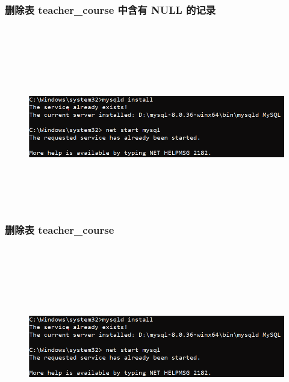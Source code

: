 \documentclass{ctexart}
\begin{document}
\subsubsection{删除表 teacher\_course 中含有 NULL 的记录}\begin{lstlisting}[language=sql]
	
\end{lstlisting}
\begin{figure}[H]
	\centering 
	\includegraphics[height=7cm,width=14cm]{1.png}
	\end{figure}
\subsubsection{删除表 teacher\_course}
\begin{lstlisting}[language=sql]
	
\end{lstlisting}
\begin{figure}[H]
	\centering 
	\includegraphics[height=7cm,width=14cm]{1.png}
	\end{figure}
\end{document}

